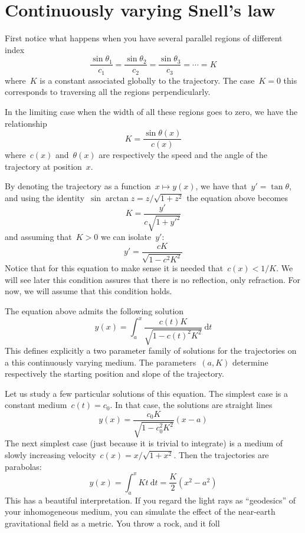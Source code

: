 \section{Continuously varying Snell's law}

First notice what happens when you have several parallel regions of different
index
$$
\frac{\sin\theta_1}{c_1}
=
\frac{\sin\theta_2}{c_2}
=
\frac{\sin\theta_3}{c_3}
=
\cdots
= K
$$
where~$K$ is a constant associated globally to the trajectory.  The
case~$K=0$ this corresponds to traversing all the regions perpendicularly.


In the limiting case when the width of all these regions goes to zero, we
have the relationship
\[
	K = \frac{\sin\theta(x)}{c(x)}
\]
where~$c(x)$ and~$\theta(x)$ are respectively the speed and the angle of the
trajectory at position~$x$.


By denoting the trajectory as a function~$x\mapsto y(x)$, we have
that~$y'=\tan\theta$, and using the identity~$\sin\arctan z=z/\sqrt{1+z^2}$
the equation above becomes
\[
	K=\frac{y'}{c\sqrt{1+y'^2}}
\]
and assuming that~$K>0$ we can isolate~$y'$:
\[
	y'=\frac{cK}{\sqrt{1-c^2K^2}}
\]
Notice that for this equation to make sense it is needed that~$c(x)<1/K$.  We
will see later this condition assures that there is no reflection, only
refraction.  For now, we will assume that this condition holds.

The equation above admits the following solution
\[
	y(x)=\int_a^x\frac{c(t)K}{\sqrt{1-c(t)^2K^2}}\ \mathrm{d} t
\]
This defines explicitly a two parameter family of solutions for the
trajectories on a this continuously varying medium.  The parameters~$(a,K)$
determine respectively the starting position and slope of the trajectory.

Let us study a few particular solutions of this equation.  The simplest case
is a constant medium~$c(t)=c_0$.  In that case, the solutions are straight
lines
\[
	y(x)=\frac{c_0K}{\sqrt{1-c_0^2K^2}}\left(x-a\right)
\]
The next simplest case (just because it is trivial to integrate) is a medium
of slowly increasing velocity~$c(x)=x/\sqrt{1+x^2}$.  Then the trajectories are
parabolas:
\[
	y(x)=\int_a^x Kt\ \mathrm{d} t = \frac{K}{2}(x^2-a^2)
\]
This has a beautiful interpretation.  If you regard the light rays as
``geodesics'' of your inhomogeneous medium, you can simulate the effect of
the near-earth gravitational field as a metric.  You throw a rock, and it
foll



